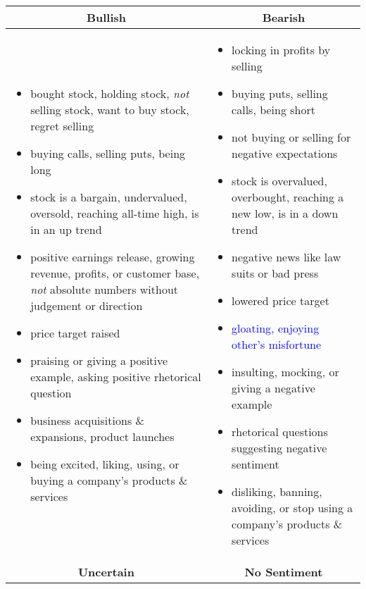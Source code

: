 
\begin{table}[!ht]
\centering
\small
\begin{tabular}{p{7.5cm}p{7.5cm}}
\toprule
\multicolumn{1}{c}{\textbf{Bullish}} & \multicolumn{1}{c}{\textbf{Bearish}} \\
\midrule

\begin{itemize}[noitemsep,leftmargin=*,topsep=-12pt]
	\item bought stock, holding stock, \emph{not} selling stock, want to buy stock, regret selling
	\item buying calls, selling puts, being long
	\item stock is a bargain, undervalued, oversold, reaching all-time high, is in an up trend
	\item positive earnings release, growing revenue, profits, or customer base, \emph{not} absolute numbers without judgement or direction
	\item price target raised
	\item praising or giving a positive example, asking positive rhetorical question
	\item business acquisitions \& expansions, product launches
	\item being excited, liking, using, or buying a company's products \& services

\end{itemize} & \begin{itemize}[noitemsep,leftmargin=*,topsep=-12pt]
	\item locking in profits by selling
	\item buying puts, selling calls, being short
	\item not buying or selling for negative expectations
 	\item stock is overvalued, overbought, reaching a new low, is in a down trend
 	\item negative news like law suits or bad press
 	\item lowered price target
 	\item \textcolor{blue}{gloating, enjoying other's misfortune}
 	\item insulting, mocking, or giving a negative example
 	\item rhetorical questions suggesting negative sentiment 
	\item disliking, banning, avoiding, or stop using a company's products \& services

\end{itemize}\\
\toprule
\multicolumn{1}{c}{\textbf{Uncertain}} & \multicolumn{1}{c}{\textbf{No Sentiment}} \\
\midrule


\end{tabular}
\end{table}
